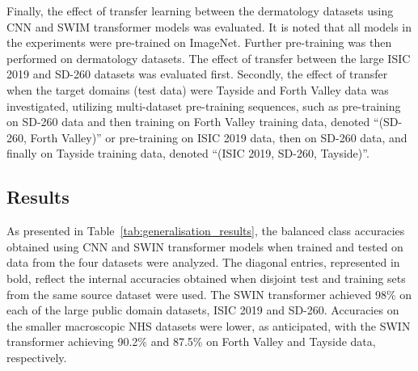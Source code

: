 Finally, the effect of transfer learning between the dermatology datasets using CNN and SWIM transformer models was evaluated. It is noted that all models in the experiments were pre-trained on ImageNet. Further pre-training was then performed on dermatology datasets. The effect of transfer between the large ISIC 2019 and SD-260 datasets was evaluated first. Secondly, the effect of transfer when the target domains (test data) were Tayside and Forth Valley data was investigated, utilizing multi-dataset pre-training sequences, such as pre-training on SD-260 data and then training on Forth Valley training data, denoted “(SD-260, Forth Valley)” or pre-training on ISIC 2019 data, then on SD-260 data, and finally on Tayside training data, denoted “(ISIC 2019, SD-260, Tayside)”.


\subsection{Results}
\label{subsec:generalisation_results}
As presented in Table~\ref{tab:generalisation_results}, the balanced class accuracies obtained using CNN and SWIN transformer models when trained and tested on data from the four datasets were analyzed. The diagonal entries, represented in bold, reflect the internal accuracies obtained when disjoint test and training sets from the same source dataset were used. The SWIN transformer achieved 98\% on each of the large public domain datasets, ISIC 2019 and SD-260. Accuracies on the smaller macroscopic NHS datasets were lower, as anticipated, with the SWIN transformer achieving 90.2\% and 87.5\% on Forth Valley and Tayside data, respectively.

